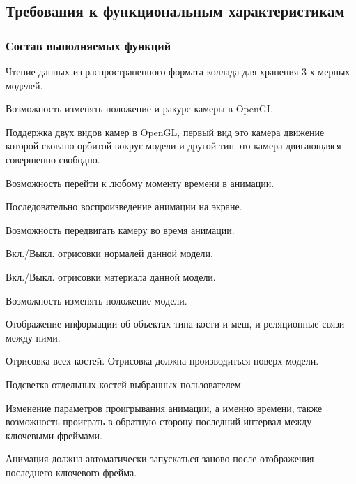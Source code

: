 

\subsection{Требования к функциональным характеристикам}
\subsubsection{Состав выполняемых функций}
\begin{my_enumerate}
\item Чтение данных из распространенного формата коллада для хранения 3-х мерных моделей.
\item Возможность изменять положение и ракурс камеры в OpenGL.
\item Поддержка двух видов камер в OpenGL, первый вид это камера движение которой сковано орбитой вокруг модели и другой тип это камера двигающаяся совершенно свободно.
\item Возможность перейти к любому моменту времени в анимации.
\item Последовательно воспроизведение анимации на экране.
\item Возможность передвигать камеру во время анимации.
\item Вкл./Выкл. отрисовки нормалей данной модели.
\item Вкл./Выкл. отрисовки материала данной модели.
\item Возможность изменять положение модели.
\item Отображение информации об объектах типа кости и меш, и реляционные связи между ними. 
\item Отрисовка всех костей. Отрисовка должна производиться поверх модели.
\item Подсветка отдельных костей выбранных пользователем.
\item Изменение параметров проигрывания анимации, а именно времени, также возможность проиграть в обратную сторону последний интервал между ключевыми фреймами.
\item Анимация должна автоматически запускаться заново после отображения последнего ключевого фрейма.
\end{my_enumerate}


